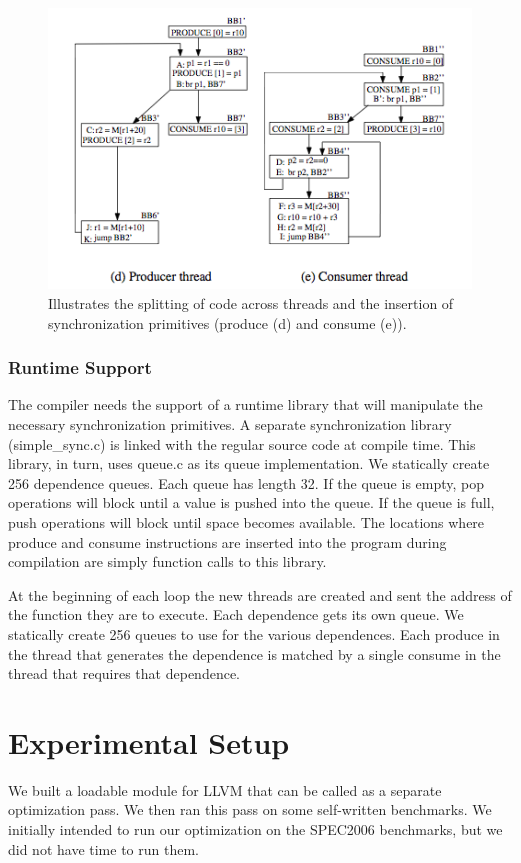 \documentclass[11pt]{article}
\begin{document}
\begin{figure}
\includegraphics[scale=0.75]{sync}
\caption{Illustrates the splitting of code across threads and the insertion of synchronization primitives (produce (d) and consume (e)).}
\label{sync}
\end{figure}

\subsubsection{Runtime Support}
The compiler needs the support of a runtime library that will manipulate the necessary synchronization primitives.  A separate synchronization library (simple\_sync.c) is linked with the regular source code at compile time.  This library, in turn, uses queue.c as its queue implementation.  We statically create 256 dependence queues.  Each queue has length 32.  If the queue is empty, pop operations will block until a value is pushed into the queue.  If the queue is full, push operations will block until space becomes available.  The locations where produce and consume instructions are inserted into the program during compilation are simply function calls to this library.

At the beginning of each loop the new threads are created and sent the address of the function they are to execute.  Each dependence gets its own queue. We statically create 256 queues to use for the various dependences.  Each produce in the thread that generates the dependence is matched by a single consume in the thread that requires that dependence.

\section{Experimental Setup}
We built a loadable module for LLVM that can be called as a separate optimization pass.  We then ran this pass on some self-written benchmarks.  We initially intended to run our optimization on the SPEC2006 benchmarks, but we did not have time to run them.
\end{document}
